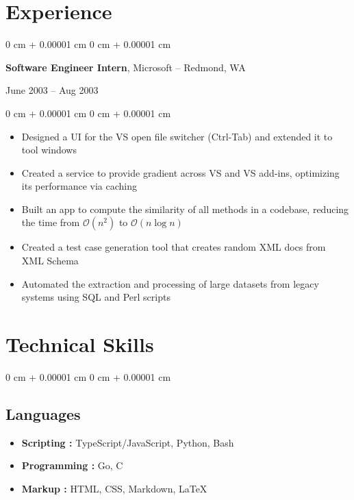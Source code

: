 \documentclass[10pt, letterpaper]{article}
\newenvironment{highlights}{
  \begin{itemize}[
    topsep=0.10 cm,
    parsep=0.10 cm,
    partopsep=0pt,
    itemsep=0pt,
    leftmargin=0 cm + 10pt
  ]
}{
  \end{itemize}
} %
\newenvironment{onecolentry}{
  \begin{adjustwidth}{
    0 cm + 0.00001 cm
  }{
    0 cm + 0.00001 cm
  }
}{
  \end{adjustwidth}
} %
\newenvironment{twocolentry}[2][]{
  \onecolentry
    \def\secondColumn{#2}
  \setcolumnwidth{\fill, 4.5 cm}
  \begin{paracol}{2}
}{
  \switchcolumn \raggedleft \secondColumn
    \end{paracol}
  \endonecolentry
} %
\begin{document}
\section{Experience}

\begin{twocolentry}{
  June 2003 – Aug 2003
}
\textbf{Software Engineer Intern}, Microsoft -- Redmond, WA
\end{twocolentry}

\vspace{0.10 cm}
\begin{onecolentry}
\begin{highlights}
\item Designed a UI for the VS open file switcher (Ctrl-Tab) and extended it to tool windows
\item Created a service to provide gradient across VS and VS add-ins, optimizing its performance via caching
\item Built an app to compute the similarity of all methods in a codebase, reducing the time from $\mathcal{O}(n^2)$ to $\mathcal{O}(n \log n)$
\item Created a test case generation tool that creates random XML docs from XML Schema
\item Automated the extraction and processing of large datasets from legacy systems using SQL and Perl scripts
\end{highlights}
\end{onecolentry}


\section{Technical Skills}

\begin{onecolentry}
\subsection{Languages}

\begin{highlights}
\item \textbf{Scripting :} TypeScript/JavaScript, Python, Bash

\item \textbf{Programming :} Go, C

\item \textbf{Markup :} HTML, CSS, Markdown, \LaTeX
\end{highlights}

\end{onecolentry}
\end{document}

